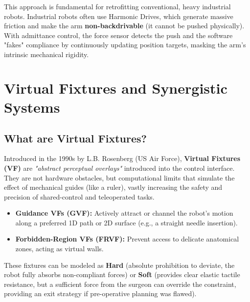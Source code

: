 \documentclass[11pt,a4paper,twoside]{report}
\begin{document}
This approach is fundamental for retrofitting conventional, heavy industrial robots. Industrial robots often use Harmonic Drives, which generate massive friction and make the arm \textbf{non-backdrivable} (it cannot be pushed physically). With admittance control, the force sensor detects the push and the software "fakes" compliance by continuously updating position targets, masking the arm's intrinsic mechanical rigidity.

\chapter{Virtual Fixtures and Synergistic Systems}

\section{What are Virtual Fixtures?}
Introduced in the 1990s by L.B. Rosenberg (US Air Force), \textbf{Virtual Fixtures (VF)} are \textit{"abstract perceptual overlays"} introduced into the control interface. They are not hardware obstacles, but computational limits that simulate the effect of mechanical guides (like a ruler), vastly increasing the safety and precision of shared-control and teleoperated tasks.
\begin{itemize}
    \item \textbf{Guidance VFs (GVF):} Actively attract or channel the robot's motion along a preferred 1D path or 2D surface (e.g., a straight needle insertion).
    \item \textbf{Forbidden-Region VFs (FRVF):} Prevent access to delicate anatomical zones, acting as virtual walls.
\end{itemize}
These fixtures can be modeled as \textbf{Hard} (absolute prohibition to deviate, the robot fully absorbs non-compliant forces) or \textbf{Soft} (provides clear elastic tactile resistance, but a sufficient force from the surgeon can override the constraint, providing an exit strategy if pre-operative planning was flawed).
\end{document}
